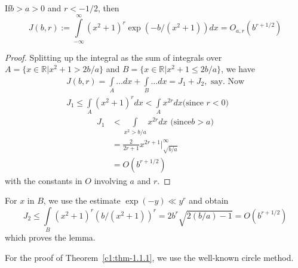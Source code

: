 \begin{sublemma}\label{c1:lem-1.1.4}
If\pageoriginale $b>a>0$ and $r<-1/2$, then
$$
J(b,r):=\int\limits^{\infty}_{-\infty}(x^{2}+1)^{r}\exp(-b/(x^{2}+1))dx=O_{a,r}(b^{r+1/2})
$$
\end{sublemma}

\begin{proof}
Splitting up the integral as the sum of integrals over
$A=\{x\in\mathbb{R}|x^{2}+1>2b/a\}$ and $B=\{x\in
\mathbb{R}|x^{2}+1\leq 2b/a\}$, we have
\begin{gather*}
J(b,r)=\int\limits_{A}\ldots dx+\int\limits_{B}\ldots
dx=J_{1}+J_{2},\text{ \ say. Now}\\
J_{1}\leq \int\limits_{A}(x^{2}+1)^{r}dx<\int\limits_{A}x^{2r}dx\text{
  (since } r<0)
\end{gather*}
\ie
\begin{align*}
J_{1} &< \int\limits_{x^{2}>b/a}x^{2r}dx\text{ \ (since} b>a)\\
&= \frac{2}{2r+1}x^{2r+1}|^{\infty}_{\sqrt{b/a}}\\
&= O(b^{r+1/2})
\end{align*}
with the constants in $O$ involving $a$ and $r$.
\end{proof}

For $x$ in $B$, we use the estimate $\exp(-y)\ll y^{r}$ and obtain 
$$
J_{2}\leq
\int\limits_{B}(x^{2}+1)^{r}(b/(x^{2}+1))^{r}=2b^{r}\sqrt{2(b/a)-1}=O(b^{r+1/2}) 
$$
which proves the lemma.

For the proof of Theorem~\ref{c1:thm-1.1.1}, we use the well-known 
circle met\-hod. 

